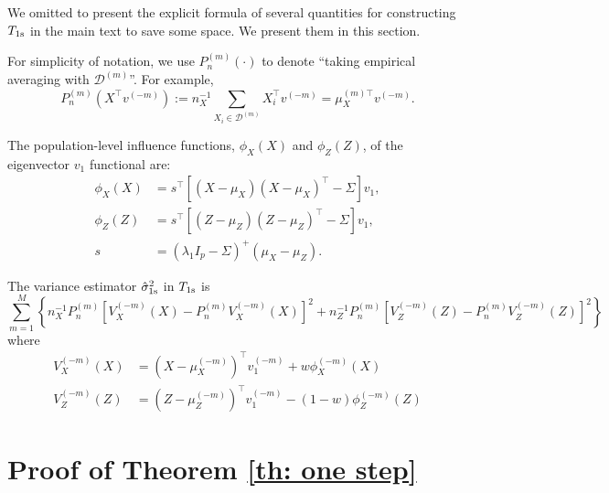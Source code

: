 \documentclass[11pt]{article}
\begin{document}
We omitted to present the explicit formula of several quantities for constructing $T_{\rm 1s}$ in the main text to save some space. We present them in this section.

For simplicity of notation, we use $P_n^{(m)}(\cdot)$ to denote ``taking empirical averaging with $\mathcal{D}^{(m)}$''. For example,
\begin{equation*}
    P_n^{(m)} (X^\top v^{(-m)}) := n_X^{-1}\sum_{X_i\in\mathcal{D}^{(m)}} X_i^\top v^{(-m)} = \mu_X^{(m)\top}v^{(-m)}.
\end{equation*}

The population-level influence functions, $\phi_X(X)$ and $\phi_Z(Z)$, of the eigenvector $v_1$ functional  are:
\begin{equation}\label{eq: define_true_influence}
    \begin{aligned}
\phi_X(X) & =s^{\top}\left[\left(X-\mu_X\right)\left(X-\mu_X \right)^{\top}-\Sigma \right] v_1 , \\
\phi_Z (Z) & =s^{ \top}\left[\left(Z-\mu_Z \right)\left(Z-\mu_Z \right)^{\top}-\Sigma \right] v_1 , \\
s  & =\left(\lambda_1 I_p-\Sigma \right)^{+}\left(\mu_X -\mu_Z \right) .
\end{aligned}
\end{equation}

The variance estimator $\hat{\sigma}_{\rm 1s}^2$ in $T_{\rm 1s}$ is 
\begin{equation}\label{eq:debiased test standard error}
        \sum_{m=1}^M\left\{n_X^{-1} P_n^{(m)}\left[V_X^{(-m)}(X)-P_n^{(m)} V_X^{(-m)}(X)\right]^2+n_Z^{-1} P_n^{(m)}\left[V_Z^{(-m)}(Z)-P_n^{(m)} V^{(-m)}_Z(Z)\right]^2\right\}   
\end{equation}
where
\begin{equation*}
    \begin{aligned}
        V_X^{(-m)}(X)& = \left(X-\mu_X^{(-m)}\right)^{\top} v_1^{(-m)}+w \phi_X^{(-m)}(X)\\
        V_Z^{(-m)}(Z)& =\left(Z-\mu_Z^{(-m)}\right)^{\top} v_1^{(-m)}-(1-w) \phi_Z^{(-m)}(Z)
    \end{aligned}
\end{equation*}

\section{Proof of Theorem \ref{th: one step}}
\label{app: debiased stat}
\end{document}
